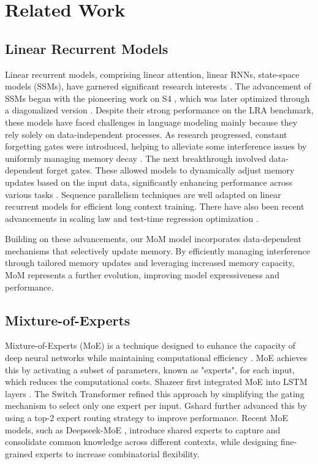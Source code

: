 \section{Related Work}
\subsection*{Linear Recurrent Models}
Linear recurrent models, comprising linear attention, linear RNNs, state-space models (SSMs), have garnered significant research interests \cite{qin2023scaling}. The advancement of SSMs began with the pioneering work on S4 \cite{gu2022efficientlymodelinglongsequences}, which was later optimized through a diagonalized version \cite{NEURIPS2022_9156b0f6}. Despite their strong performance on the LRA benchmark, these models have faced challenges in language modeling mainly because they rely solely on data-independent processes. As research progressed, constant forgetting gates were introduced, helping to alleviate some interference issues by uniformly managing memory decay \cite{sun2023retentive, gu2024mambalineartimesequencemodeling}. The next breakthrough involved data-dependent forget gates. These allowed models to dynamically adjust memory updates based on the input data, significantly enhancing performance across various tasks \cite{qin2024various, qin2024hgrn2, yang2023gated, zhang2024gated, yang2024gated,qin2024unlocking}. Sequence parallelism techniques are well adapted on linear recurrent models \cite{sun2024linear,sun2025lasp} for efficient long context training. There have also been recent advancements in scaling law and test-time regression optimization \cite{shen2024scaling,sun2024learning, behrouz2024titans}.

Building on these advancements, our MoM model incorporates data-dependent mechanisms that selectively update memory. By efficiently managing interference through tailored memory updates and leveraging increased memory capacity, MoM represents a further evolution, improving model expressiveness and performance.

\subsection*{Mixture-of-Experts}
Mixture-of-Experts (MoE) is a technique designed to enhance the capacity of deep neural networks while maintaining computational efficiency \cite{fedus2022switch, rajbhandari2020zero, lepikhin2020gshard, tang2023ms, zhu2024llama, qu2024llama}. MoE achieves this by activating a subset of parameters, known as "experts", for each input, which reduces the computational costs. Shazeer first integrated MoE into LSTM layers \cite{shazeer2017outrageously}. The Switch Transformer \cite{fedus2022switch} refined this approach by simplifying the gating mechanism to select only one expert per input. Gshard \cite{lepikhin2020gshard} further advanced this by using a top-2 expert routing strategy to improve performance. Recent MoE models, such as Deepseek-MoE \cite{dai2024deepseekmoe}, introduce shared experts to capture and consolidate common knowledge across different contexts, while designing fine-grained experts to increase combinatorial flexibility.